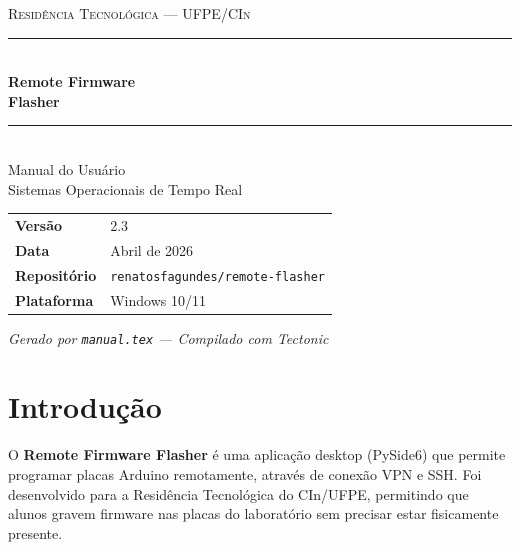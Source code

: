 \documentclass[12pt,a4paper]{article}
\begin{document}
\begin{titlepage}
  \pagecolor{azulescuro}
  \color{white}
  \vspace*{2cm}

  \begin{center}
    {\fontsize{11}{13}\selectfont\scshape Residência Tecnológica --- UFPE/CIn}\\[0.8cm]
    \rule{\linewidth}{1.5pt}\\[0.6cm]
    {\fontsize{28}{34}\selectfont\bfseries Remote Firmware\\Flasher}\\[0.4cm]
    \rule{\linewidth}{1.5pt}\\[0.8cm]
    {\fontsize{15}{18}\selectfont Manual do Usuário}\\[0.3cm]
    {\fontsize{12}{15}\selectfont\color{azulclaro}%
      Sistemas Operacionais de Tempo Real}\\[2.5cm]
  \end{center}

  \begin{tcolorbox}[
    colback=white, colframe=white,
    coltext=azulescuro,
    width=0.75\textwidth,
    center, arc=3pt,
    left=10pt, right=10pt, top=6pt, bottom=6pt
  ]
    \small
    \begin{tabular}{@{}ll@{}}
      \textbf{Versão}          & 2.3 \\
      \textbf{Data}            & Abril de 2026 \\
      \textbf{Repositório}     & \texttt{renatosfagundes/remote-flasher} \\
      \textbf{Plataforma}      & Windows 10/11 \\
    \end{tabular}
  \end{tcolorbox}

  \vfill
  {\small\itshape Gerado por \texttt{manual.tex} --- Compilado com Tectonic}
\end{titlepage}
\pagecolor{white}
\color{black}

\tableofcontents
\newpage

\section{Introdução}

O \textbf{Remote Firmware Flasher} é uma aplicação desktop (PySide6) que permite programar placas Arduino remotamente, através de conexão VPN e SSH. Foi desenvolvido para a Residência Tecnológica do CIn/UFPE, permitindo que alunos gravem firmware nas placas do laboratório sem precisar estar fisicamente presente.
\end{document}
